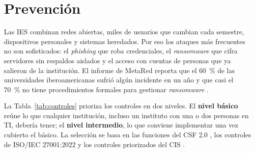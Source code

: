\documentclass[11pt,a4paper,oneside]{report}
\begin{document}
\chapter{Prevención}
\label{cap:prevencion}
Las IES combinan redes abiertas, miles de usuarios que cambian cada semestre, dispositivos personales y sistemas heredados. Por eso los ataques más frecuentes no son sofisticados: el \textit{phishing} que roba credenciales, el \textit{ransomware} que cifra servidores sin respaldos aislados y el acceso con cuentas de personas que ya salieron de la institución. El informe de MetaRed reporta que el 60~\% de las universidades iberoamericanas sufrió algún incidente en un año y que casi el 70~\% no tiene procedimientos formales para gestionar \textit{ransomware} \cite{metared2025imc}.

La Tabla~\ref{tab:controles} prioriza los controles en dos niveles. El \textbf{nivel básico} reúne lo que cualquier institución, incluso un instituto con una o dos personas en TI, debería tener; el \textbf{nivel intermedio}, lo que conviene implementar una vez cubierto el básico. La selección se basa en las funciones del CSF 2.0 \cite{nistcsf2024}, los controles de ISO/IEC 27001:2022 \cite{iso27001_2022} y los controles priorizados del CIS \cite{cis2024}.
\end{document}

